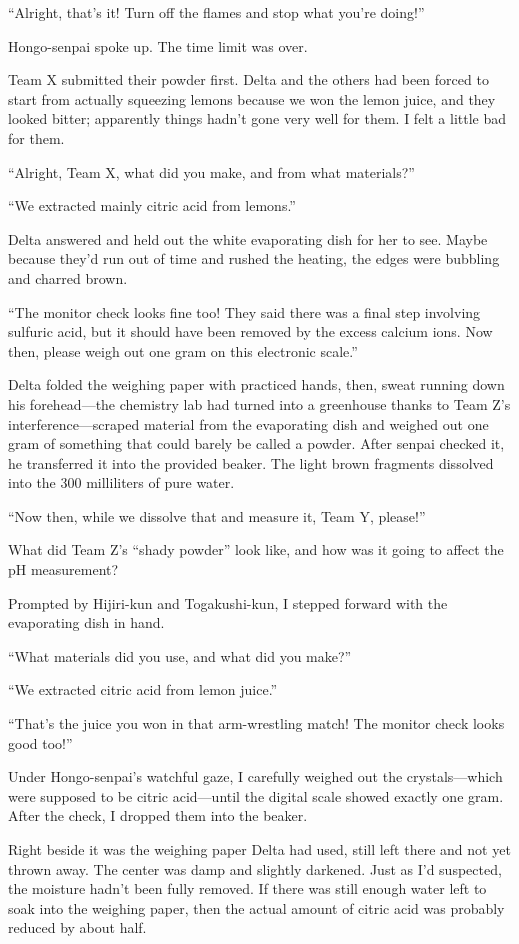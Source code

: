 \documentclass[
    a4paper,
    12pt,
    twoside,
    openany,
    UTF8,
    fontset=windows
]{ctexbook}
\begin{document}
``Alright, that's it! Turn off the flames and stop what you're doing!''

Hongo-senpai spoke up. The time limit was over.

Team X submitted their powder first. Delta and the others had been forced to start from actually squeezing lemons because we won the lemon juice, and they looked bitter; apparently things hadn't gone very well for them. I felt a little bad for them.

``Alright, Team X, what did you make, and from what materials?''

``We extracted mainly citric acid from lemons.''

Delta answered and held out the white evaporating dish for her to see. Maybe because they'd run out of time and rushed the heating, the edges were bubbling and charred brown.

``The monitor check looks fine too! They said there was a final step involving sulfuric acid, but it should have been removed by the excess calcium ions. Now then, please weigh out one gram on this electronic scale.''

Delta folded the weighing paper with practiced hands, then, sweat running down his forehead---the chemistry lab had turned into a greenhouse thanks to Team Z's interference---scraped material from the evaporating dish and weighed out one gram of something that could barely be called a powder. After senpai checked it, he transferred it into the provided beaker. The light brown fragments dissolved into the 300 milliliters of pure water.

``Now then, while we dissolve that and measure it, Team Y, please!''

What did Team Z's ``shady powder'' look like, and how was it going to affect the pH measurement?

Prompted by Hijiri-kun and Togakushi-kun, I stepped forward with the evaporating dish in hand.

``What materials did you use, and what did you make?''

``We extracted citric acid from lemon juice.''

``That's the juice you won in that arm-wrestling match! The monitor check looks good too!''

Under Hongo-senpai's watchful gaze, I carefully weighed out the crystals---which were supposed to be citric acid---until the digital scale showed exactly one gram. After the check, I dropped them into the beaker.

Right beside it was the weighing paper Delta had used, still left there and not yet thrown away. The center was damp and slightly darkened. Just as I'd suspected, the moisture hadn't been fully removed. If there was still enough water left to soak into the weighing paper, then the actual amount of citric acid was probably reduced by about half.
\end{document}
